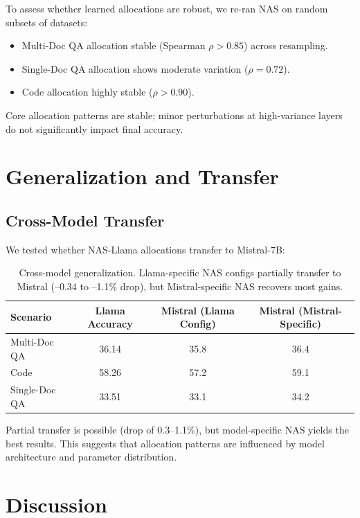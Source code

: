 \documentclass[11pt,a4paper]{article}
\begin{document}
To assess whether learned allocations are robust, we re-ran NAS on random subsets of datasets:
\begin{itemize}
    \item Multi-Doc QA allocation stable (Spearman $\rho > 0.85$) across resampling.
    \item Single-Doc QA allocation shows moderate variation ($\rho = 0.72$).
    \item Code allocation highly stable ($\rho > 0.90$).
\end{itemize}

Core allocation patterns are stable; minor perturbations at high-variance layers do not significantly impact final accuracy.

\section{Generalization and Transfer}

\subsection{Cross-Model Transfer}

We tested whether NAS-Llama allocations transfer to Mistral-7B:

\begin{table}[t]
\centering
\small
\begin{tabular}{l c c c}
\toprule
\textbf{Scenario} & \textbf{Llama Accuracy} & \textbf{Mistral (Llama Config)} & \textbf{Mistral (Mistral-Specific)} \\
\midrule
Multi-Doc QA & 36.14 & 35.8 & 36.4 \\
Code & 58.26 & 57.2 & 59.1 \\
Single-Doc QA & 33.51 & 33.1 & 34.2 \\
\bottomrule
\end{tabular}
\caption{Cross-model generalization. Llama-specific NAS configs partially transfer to Mistral (–0.34 to –1.1\% drop), but Mistral-specific NAS recovers most gains.}
\label{tab:transfer}
\end{table}

Partial transfer is possible (drop of 0.3–1.1\%), but model-specific NAS yields the best results. This suggests that allocation patterns are influenced by model architecture and parameter distribution.

\section{Discussion}
\end{document}
